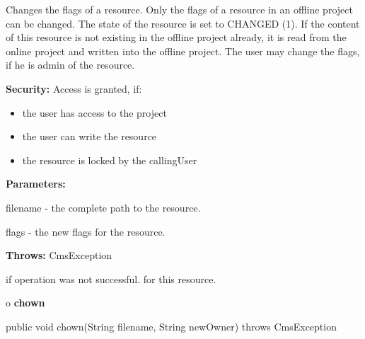 \begin{description}
\htmlDD Changes the flags of a resource. \htmlBR
Only the flags of a resource in an offline project can be changed. The state
of the resource is set to CHANGED (1). If the content of this resource is not
existing in the offline project already, it is read from the online project
and written into the offline project. The user may change the flags, if he is
admin of the resource. 

{\bf Security:} Access is granted, if: 

\begin{itemize}
\item the user has access to the project 
\item the user can write the resource 
\item the resource is locked by the callingUser 
\end{itemize}

\begin{description}
\item {\bf Parameters:}  

filename - the complete path to the resource.  

flags - the new flags for the resource.  
\item {\bf Throws:} CmsException  

if operation was not successful. for this resource.  
\end{description}

\end{description}

o {\bf chown} 

\begin{PRE}
 public void chown(String filename,
                   String newOwner) throws CmsException
\end{PRE}

